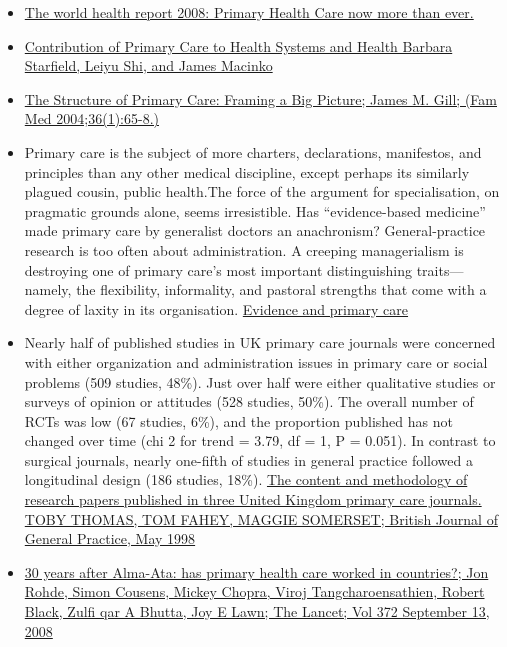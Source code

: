 \documentclass[]{book}
\begin{document}
\begin{itemize}
\item
  \href{https://www.who.int/whr/2008/whr08_en.pdf}{The world health report 2008: Primary Health Care now more than ever.}
\item
  \href{https://www.ncbi.nlm.nih.gov/pmc/articles/PMC2690145/}{Contribution of Primary Care to Health Systems and Health Barbara Starfield, Leiyu Shi, and James Macinko}
\item
  \href{https://fammedarchives.blob.core.windows.net/imagesandpdfs/fmhub/fm2004/January/James65.pdf}{The Structure of Primary Care: Framing a Big Picture; James M. Gill; (Fam Med 2004;36(1):65-8.)}
\item
  Primary care is the subject of more charters, declarations, manifestos, and principles than any other medical discipline, except perhaps its similarly plagued cousin, public health.The force of the argument for specialisation, on pragmatic grounds alone, seems irresistible. Has ``evidence-based medicine'' made primary care by generalist doctors an anachronism? General-practice research is too often about administration. A creeping managerialism is destroying one of primary care's most important distinguishing traits---namely, the flexibility, informality, and pastoral strengths that come with a degree of laxity in its organisation. \href{https://sci-hub.se/https://doi.org/10.1016/S0140-6736(99)00056-2}{Evidence and primary care}
\item
  Nearly half of published studies in UK primary care journals were concerned with either organization and administration issues in primary care or social problems (509 studies, 48\%). Just over half were either qualitative studies or surveys of opinion or attitudes (528 studies, 50\%). The overall number of RCTs was low (67 studies, 6\%), and the proportion published has not changed over time (chi 2 for trend = 3.79, df = 1, P = 0.051). In contrast to surgical journals, nearly one-fifth of studies in general practice followed a longitudinal design (186 studies, 18\%). \href{https://www.ncbi.nlm.nih.gov/pmc/articles/PMC1410169/pdf/brjgenprac00086-0019.pdf}{The content and methodology of research papers published in three United Kingdom primary care journals. TOBY THOMAS, TOM FAHEY, MAGGIE SOMERSET; British Journal of General Practice, May 1998}
\item
  \href{https://sci-hub.se/https://doi.org/10.1016/S0140-6736(08)61405-1}{30 years after Alma-Ata: has primary health care worked in countries?; Jon Rohde, Simon Cousens, Mickey Chopra, Viroj Tangcharoensathien, Robert Black, Zulfi qar A Bhutta, Joy E Lawn; The Lancet; Vol 372 September 13, 2008}

\end{itemize}
\end{document}
